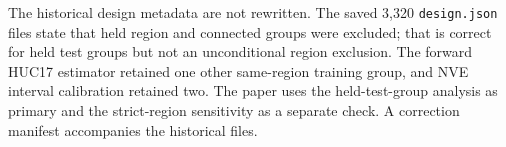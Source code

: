 The historical design metadata are not rewritten. The saved 3,320 \texttt{design.json} files state that held region and connected groups were excluded; that is correct for held test groups but not an unconditional region exclusion. The forward HUC17 estimator retained one other same-region training group, and NVE interval calibration retained two. The paper uses the held-test-group analysis as primary and the strict-region sensitivity as a separate check. A correction manifest accompanies the historical files.
